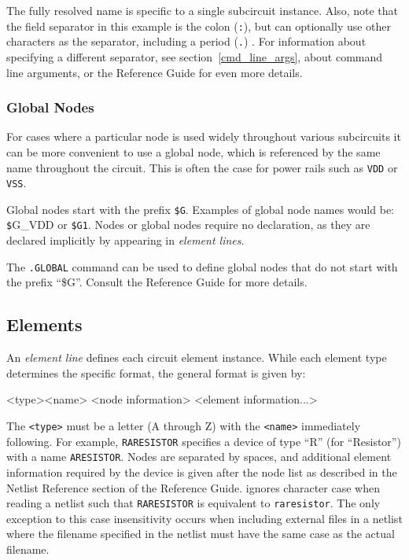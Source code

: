 The fully resolved name is specific to a single subcircuit instance.  
Also, note that the field separator in this example is the colon (\texttt{:}), but \Xyce{} can 
optionally use other characters as the separator, including a period (\texttt{.}) .  
For information about specifying a different separator, see section~\ref{cmd_line_args}, 
about \Xyce{} command line arguments, or the \Xyce{} Reference Guide\ReferenceGuide{} 
for even more details.

\subsubsection{Global Nodes}
For cases where a particular node is used widely throughout various
subcircuits it can be more convenient to use a global node, which is
referenced by the same name throughout the circuit.  This is often the
case for power rails such as \texttt{VDD} or \texttt{VSS}.

Global nodes start with the prefix \texttt{\$G}.  Examples of global node names would be:
{\texttt \$G\_VDD} or \texttt{\$G1}.  Nodes or global nodes require no declaration, as they are declared implicitly by appearing in \emph{element lines\/}.

The \texttt{.GLOBAL} command can be 
used to define global nodes that do not start with the prefix ``\$G''.
Consult the \Xyce{} Reference Guide\ReferenceGuide{} for more details. 

\subsection{Elements}

An \emph{element line\/} defines each circuit element instance. While each element type determines the specific format, the general format is given by:
\begin{vquote}
<type><name> <node information> <element information...>
\end{vquote}
The \texttt{<type>} must be a letter (A through Z) with the
\texttt{<name>} immediately following.  For example, \texttt{RARESISTOR}
specifies a device of type ``R'' (for ``Resistor'') with a name
\texttt{ARESISTOR}.  Nodes are separated by spaces, and additional
element information required by the device is given after the node
list as described in the Netlist Reference section of the \Xyce{}
Reference Guide\ReferenceGuide{}.
\Xyce{} ignores character case when reading 
a netlist such that \texttt{RARESISTOR} is equivalent to \texttt{raresistor}.  The 
only exception to this case insensitivity occurs when including external files in a netlist  where 
the filename specified in the netlist must have the same case as the actual filename.

